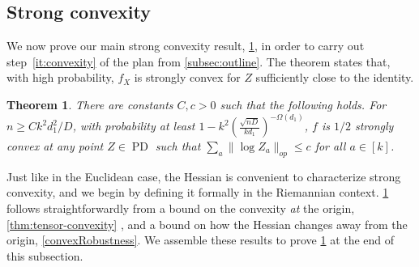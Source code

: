 \documentclass{article}
\newtheorem{theorem}{Theorem}
\newcommand\PD{\operatorname{PD}}
\newcommand\samp{x}
\newcommand\rv{X}
\newcommand{\CF}[1]{{\color{purple}[CF: #1]}}
\begin{document}





\subsection{Strong convexity}




We now prove our main strong convexity result, \cref{thm:ball-convexity}, in order to carry out step~\ref{it:convexity} of the plan from \cref{subsec:outline}. The theorem states that, with high probability, $f_X$ is strongly convex for $Z$ sufficiently close to the identity.



\begin{theorem}\label{thm:ball-convexity} There are constants $C,c>0$ such that the following holds. For $n \geq C k^2 d_1^2/D$, with probability at least $1 - k^2 \left(\frac {\sqrt{nD}}{kd_1}\right)^{ - \Omega(d_1)}$, $f$ is $1/2$ strongly convex at any point $Z \in \PD$ such that $\sum_a \|\log Z_a\|_{op} \leq c$ for all $a \in [k]$. 
\end{theorem}


Just like in the Euclidean case, the Hessian is convenient to characterize strong convexity, and we begin by defining it formally in the Riemannian context. \cref{thm:ball-convexity} follows straightforwardly from a bound on the convexity \emph{at} the origin,  \cref{thm:tensor-convexity} , and a bound on how the Hessian changes away from the origin, \cref{convexRobustness}. We assemble these results to prove \cref{thm:ball-convexity} at the end of this subsection. %
\end{document}
